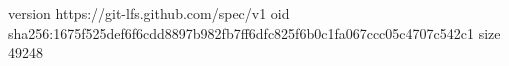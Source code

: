 version https://git-lfs.github.com/spec/v1
oid sha256:1675f525def6f6cdd8897b982fb7ff6dfc825f6b0c1fa067ccc05c4707c542c1
size 49248
